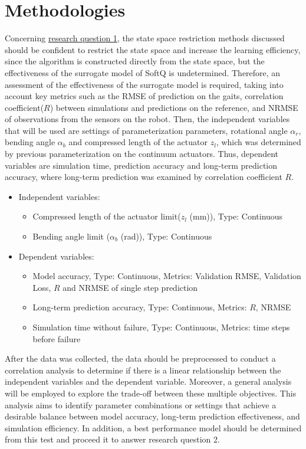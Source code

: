 \section{Methodologies}
\label{Sec:test_def}
Concerning \hyperref[rq1]{research question 1}, the state space restriction methods discussed should be confident to restrict the state space and increase the learning efficiency, since the algorithm is constructed directly from the state space, but the effectiveness of the surrogate model of SoftQ is undetermined. Therefore, an assessment of the effectiveness of the surrogate model is required, taking into account key metrics such as the \ac{RMSE} of prediction on the gaits, correlation coefficient($R$) between simulations and predictions on the reference, and \ac{NRMSE} of observations from the sensors on the robot. Then, the independent variables that will be used are settings of parameterization parameters, rotational angle $\alpha_r$, bending angle $\alpha_b$ and compressed length of the actuator $z_l$, which was determined by previous parameterization on the continuum actuators\cite{jiOmnidirectionalWalkingQuadruped2022}. Thus, dependent variables are simulation time, prediction accuracy and long-term prediction accuracy, where long-term prediction was examined by correlation coefficient $R$.
\begin{itemize}
    \item Independent variables: 
    \begin{itemize}
        \item Compressed length of the actuator limit($z_l$ (mm)), Type: Continuous
        \item Bending angle limit ($\alpha_b$ (rad)), Type: Continuous
    \end{itemize}
    \item Dependent variables:
    \begin{itemize}
        \item Model accuracy, Type: Continuous, Metrics: Validation RMSE, Validation Loss, $R$ and NRMSE of single step prediction
        \item Long-term prediction accuracy, Type: Continuous, Metrics: $R$, NRMSE
        \item Simulation time without failure, Type: Continuous, Metrics: time steps before failure 
    \end{itemize}
\end{itemize}
After the data was collected, the data should be preprocessed to conduct a correlation analysis to determine if there is a linear relationship between the independent variables and the dependent variable. Moreover, a general analysis will be employed to explore the trade-off between these multiple objectives. This analysis aims to identify parameter combinations or settings that achieve a desirable balance between model accuracy, long-term prediction effectiveness, and simulation efficiency. In addition, a best performance model should be determined from this test and proceed it to answer research question 2. 

